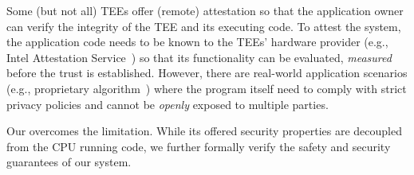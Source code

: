 




  


 Some (but not all) TEEs offer (remote) attestation so that the application owner can verify the integrity of the TEE and its executing code. To attest the system, the application code needs to be known to the TEEs' hardware provider (e.g., Intel Attestation Service~\cite{ias}) so that its functionality can be evaluated, {\em measured} before the trust is established. However, there are real-world application scenarios (e.g., proprietary algorithm~\cite{}) where the program itself need to comply with strict privacy policies and cannot be {\em openly} exposed to multiple parties. 

 Our \projecttitle{} overcomes the limitation. While its offered security properties are decoupled from the CPU running code, we further formally verify the safety and security guarantees of our system.

